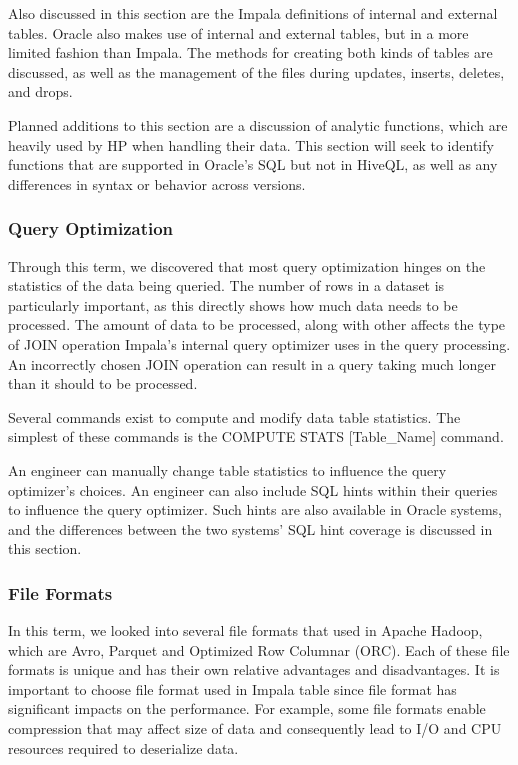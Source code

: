\documentclass[onecolumn, draftclsnofoot,10pt, compsoc]{IEEEtran}
\begin{document}
Also discussed in this section are the Impala definitions of internal and external tables.
Oracle also makes use of internal and external tables, but in a more limited fashion than Impala.
The methods for creating both kinds of tables are discussed, as well as the management of the files during updates, inserts, deletes, and drops. 

Planned additions to this section are a discussion of analytic functions, which are heavily used by HP when handling their data.
This section will seek to identify functions that are supported in Oracle’s SQL but not in HiveQL, as well as any differences in syntax or behavior across versions. 

\subsubsection{Query Optimization}
Through this term, we discovered that most query optimization hinges on the statistics of the data being queried.
The number of rows in a dataset is particularly important, as this directly shows how much data needs to be processed.
The amount of data to be processed, along with other  affects the type of JOIN operation Impala’s internal query optimizer uses in the query processing.
An incorrectly chosen JOIN operation can result in a query taking much longer than it should to be processed. 

Several commands exist to compute and modify data table statistics. The simplest of these commands is the COMPUTE STATS [Table\_Name] command. 

An engineer can manually change table statistics to influence the query optimizer’s choices.
An engineer can also include SQL hints within their queries to influence the query optimizer.
Such hints are also available in Oracle systems, and the differences between the two systems’ SQL hint coverage is discussed in this section.  

\subsubsection{File Formats}
In this term, we looked into several file formats that used in Apache Hadoop, which are Avro, Parquet and Optimized Row Columnar (ORC). Each of these file formats is unique and has their own relative advantages and disadvantages. It is important to choose file format used in Impala table since file format has significant impacts on the performance. For example, some file formats enable compression that may affect size of data and consequently lead to I/O and CPU resources required to deserialize data.
 
\end{document}
